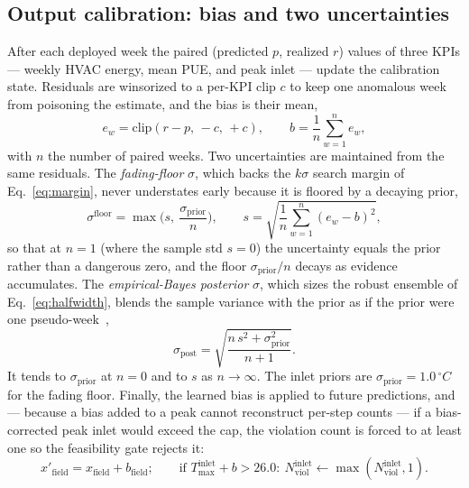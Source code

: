 \documentclass[11pt]{article}
\newcommand{\degC}{\ensuremath{^{\circ}}C}
\newcommand{\sigpost}{\sigma_{\mathrm{post}}}
\begin{document}
\subsection{Output calibration: bias and two uncertainties}
\label{sec:calib}
After each deployed week the paired (predicted \(p\), realized \(r\)) values of three KPIs
--- weekly HVAC energy, mean PUE, and peak inlet --- update the calibration state. Residuals
are winsorized to a per-KPI clip \(c\) to keep one anomalous week from poisoning the
estimate, and the bias is their mean,
\begin{equation}
e_w = \mathrm{clip}(r-p,\,-c,\,+c),
\qquad
b = \frac{1}{n}\sum_{w=1}^{n} e_w,
\label{eq:bias}
\end{equation}
with \(n\) the number of paired weeks. Two uncertainties are maintained from the same
residuals. The \emph{fading-floor} \(\sigma\), which backs the \(k\sigma\) search margin of
Eq.~\eqref{eq:margin}, never understates early because it is floored by a decaying prior,
\begin{equation}
\sigma^{\mathrm{floor}} = \max\!\Big(s,\ \frac{\sigma_{\mathrm{prior}}}{n}\Big),
\qquad
s = \sqrt{\frac{1}{n}\sum_{w=1}^{n}(e_w-b)^2},
\label{eq:fadingfloor}
\end{equation}
so that at \(n=1\) (where the sample std \(s=0\)) the uncertainty equals the prior rather
than a dangerous zero, and the floor \(\sigma_{\mathrm{prior}}/n\) decays as evidence
accumulates. The \emph{empirical-Bayes posterior} \(\sigma\), which sizes the robust
ensemble of Eq.~\eqref{eq:halfwidth}, blends the sample variance with the prior as if the
prior were one pseudo-week~\cite{casella},
\begin{equation}
\sigpost = \sqrt{\frac{n\,s^2 + \sigma_{\mathrm{prior}}^2}{n+1}}.
\label{eq:sigpost}
\end{equation}
It tends to \(\sigma_{\mathrm{prior}}\) at \(n=0\) and to \(s\) as \(n\to\infty\). The
inlet priors are \(\sigma_{\mathrm{prior}}=1.0\,\degC\) for the fading floor. Finally, the
learned bias is applied to future predictions, and --- because a bias added to a peak cannot
reconstruct per-step counts --- if a bias-corrected peak inlet would exceed the cap, the
violation count is forced to at least one so the feasibility gate rejects it:
\begin{equation}
x'_{\mathrm{field}} = x_{\mathrm{field}} + b_{\mathrm{field}};
\qquad
\text{if } T^{\mathrm{inlet}}_{\max}+b > 26.0:\ N^{\mathrm{inlet}}_{\mathrm{viol}}\leftarrow \max(N^{\mathrm{inlet}}_{\mathrm{viol}},1).
\label{eq:biasapply}
\end{equation}
\end{document}
